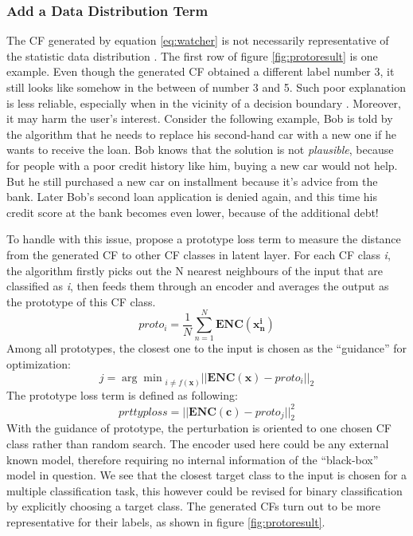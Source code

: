 \subsubsection{Add a Data Distribution Term}
The CF generated by equation \ref{eq:watcher} is not necessarily representative of the statistic data distribution \cite{FACE}. The first row of figure \ref{fig:protoresult} is one example. Even though the generated CF obtained a different label number 3, it still looks like somehow in the between of number 3 and 5. Such poor explanation is less reliable, especially when in the vicinity of a decision boundary \cite{FACE}. Moreover, it may harm the user's interest. Consider the following example, Bob is told by the algorithm that he needs to replace his second-hand car with a new one if he wants to receive the loan. Bob knows that the solution is not \emph{plausible}, because for people with a poor credit history like him, buying a new car would not help. But he still purchased a new car on installment because it's advice from the bank. Later Bob's second loan application is denied again, and this time his credit score at the bank becomes even lower, because of the additional debt!

To handle with this issue, \citeauthor{prototype} \cite{prototype} propose a prototype loss term to measure the distance from the generated CF to other CF classes in latent layer. For each CF class \emph{i}, the algorithm firstly picks out the N nearest neighbours of the input that are classified as \emph{i}, then feeds them through an encoder and averages the output as the prototype of this CF class.
\begin{equation}\label{eq:prototype}
  proto_i=\frac{1}{N}\sum_{n=1}^{N}\mathbf{ENC}(\mathbf{x_n^i})
\end{equation}
Among all prototypes, the closest one to the input is chosen as the ``guidance'' for optimization:
\begin{equation}\label{eq:closestProto}
  j = {\arg\min}_{i\neq f(\textbf{x})}||\mathbf{ENC}(\textbf{x})-proto_i||_2
\end{equation}
The prototype loss term is defined as following:
\begin{equation}\label{eq:protoloss}
  prttyploss=||\mathbf{ENC}(\textbf{c})-proto_j||_2^2
\end{equation}
With the guidance of prototype, the perturbation is oriented to one chosen CF class rather than random search. The encoder used here could be any external known model, therefore requiring no internal information of the ``black-box'' model in question. We see that the closest target class to the input is chosen for a multiple classification task, this however could be revised for binary classification by explicitly choosing a target class. The generated CFs turn out to be more representative for their labels, as shown in figure \ref{fig:protoresult}.

